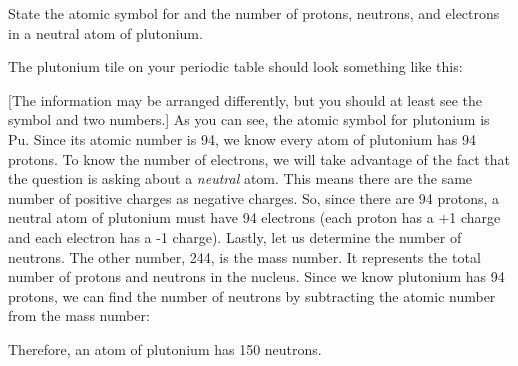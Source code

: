 \begin{Worked}
\begin{Problem}
State the atomic symbol for and the number of protons,
neutrons, and electrons in a neutral atom of plutonium.
\end{Problem}
\begin{Solution}
The plutonium tile on your periodic table should look
something like this:
\begin{center}
\end{center}

[The information may be arranged differently, but you should at least see the
symbol and two numbers.] As you can see, the atomic symbol for plutonium is Pu.
Since its atomic number is 94, we know every atom of plutonium has 94 protons.
To know the number of electrons, we will take advantage of the fact that the
question is asking about a \textit{neutral} atom. This means there are the same
number of positive charges as negative charges. So, since there are 94 protons,
a neutral atom of plutonium must have 94 electrons (each proton has a +1 charge
and each electron has a -1 charge). Lastly, let us determine the number of
neutrons. The other number, 244, is the mass number. It represents the total
number of protons and neutrons in the nucleus. Since we know plutonium has 94
protons, we can find the number of neutrons by subtracting the atomic number
from the mass number:

\begin{center}
\end{center}

Therefore, an atom of plutonium has 150 neutrons.
\end{Solution}
\end{Worked}

